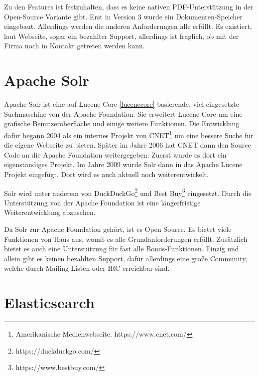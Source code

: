 Zu den Features ist festzuhalten, dass es keine nativen PDF-Unterstützung in der Open-Source Variante gibt. Erst in Version 3 wurde ein Dokumenten-Speicher eingebaut. Allerdings werden die anderen Anforderungen alle erfüllt. Es existiert, laut Webseite, sogar ein bezahlter Support, allerdings ist fraglich, ob mit der Firma noch in Kontakt getreten werden kann. \cite{SphinxTechnologiesInc.2019}

\section{Apache Solr}
\label{solr}

Apache Solr ist eine auf Lucene Core \ref{lucenecore} basierende, viel eingesetzte Suchmaschine von der Apache Foundation. Sie erweitert Lucene Core um eine grafische Benutzeroberfläche und einige weitere Funktionen. 
Die Entwicklung dafür begann 2004 als ein internes Projekt von CNET\footnote{Amerikanische Medienwebseite. https://www.cnet.com/} um eine bessere Suche für die eigene Webseite zu bieten. Später im Jahre 2006 hat CNET dann den Source Code an die Apache Foundation weitergegeben. Zuerst wurde es dort ein eigenständiges Projekt. Im Jahre 2009 wurde Solr dann in das Apache Lucene Projekt eingefügt. Dort wird es auch aktuell noch weiterentwickelt. \cite{Wikipedia.2019b}

Solr wird unter anderem von DuckDuckGo\footnote{https://duckduckgo.com/} und Best Buy\footnote{https://www.bestbuy.com/} eingesetzt. Durch die Unterstützung von der Apache Foundation ist eine längerfristige Weiterentwicklung abzusehen. 

Da Solr zur Apache Foundation gehört, ist es Open Source. Es bietet viele Funktionen von Haus aus, womit es alle Grundanforderungen erfüllt. Zusätzlich bietet es auch eine Unterstützung für fast alle Bonus-Funktionen. Einzig und allein gibt es keinen bezahlten Support, dafür allerdings eine große Community, welche durch Mailing Listen oder IRC erreichbar sind. \cite{TheApacheSoftwareFoundation.2019}

\section{Elasticsearch}
\label{elasticsearch}

